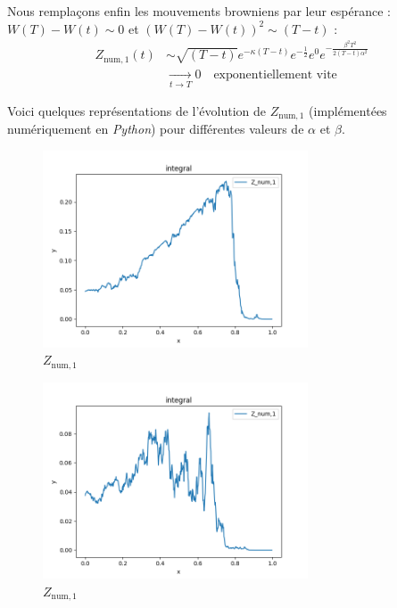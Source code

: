 \documentclass[../finalreport.tex]{subfiles}
\begin{document}
\par Nous remplaçons enfin les mouvements browniens par leur espérance : $W\left(T\right) -  W\left(t\right) \sim 0$ et $  \left( W\left(T\right) -  W\left(t\right) \right)^2 \sim (T - t)$ : 
\begin{displaymath}
	\begin{split}
	Z_{\text{num}, 1} \left( t \right) &\sim \sqrt{(T - t)} e^{- {\kappa} \left( T - t\right)}  e^{ - \frac{1}{2}} e^{0} e^{ - \frac{\beta^2 T^2}{2 (T - t) \alpha^2}} \\
	& \xrightarrow[t \to T]{} 0 \quad \text{exponentiellement vite}
	\end{split}
\end{displaymath}

\par Voici quelques représentations de l'évolution de $Z_{\text{num}, 1}$ (implémentées numériquement en \emph{Python}) pour différentes valeurs de $\alpha$ et $\beta$.
 
\begin{figure}[H]
  \centering
    \includegraphics[width=0.7\textwidth]{images/paradox_1.png}
  \caption{$Z_{\text{num}, 1}$}
\end{figure}

\begin{figure}[H]
  \centering
    \includegraphics[width=0.7\textwidth]{images/paradox_2.png}
  \caption{$Z_{\text{num}, 1}$}
\end{figure}
\end{document}
